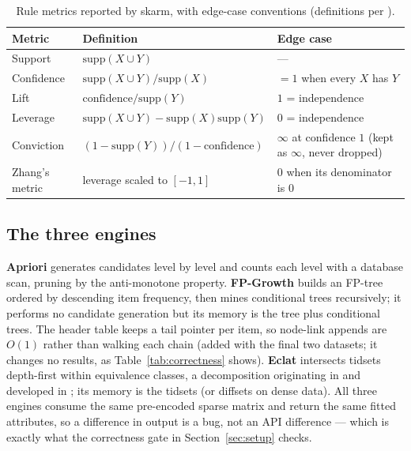 \documentclass[journal,a4paper]{IEEEtran}
\newcommand{\skarm}{skarm\xspace}
\begin{document}
\begin{table}[t]
\centering
\caption{Rule metrics reported by \skarm, with edge-case conventions
(definitions per \cite{hahsler}).}
\label{tab:metrics}
\begin{tabular}{lll}
\toprule
Metric & Definition & Edge case \\
\midrule
Support & $\mathrm{supp}(X \cup Y)$ & --- \\
Confidence & $\mathrm{supp}(X \cup Y) / \mathrm{supp}(X)$ & $=1$ when every $X$ has $Y$ \\
Lift & $\mathrm{confidence} / \mathrm{supp}(Y)$ & $1$ = independence \\
Leverage & $\mathrm{supp}(X \cup Y) - \mathrm{supp}(X)\mathrm{supp}(Y)$ & $0$ = independence \\
Conviction & $(1 - \mathrm{supp}(Y)) / (1 - \mathrm{confidence})$ & $\infty$ at confidence $1$ (kept as $\infty$, never dropped) \\
Zhang's metric & leverage scaled to $[-1, 1]$ & $0$ when its denominator is $0$ \\
\bottomrule
\end{tabular}
\end{table}

\subsection{The three engines}
\textbf{Apriori} generates candidates level by level and counts each
level with a database scan, pruning by the anti-monotone property.
\textbf{FP-Growth} builds an FP-tree ordered by descending item
frequency, then mines conditional trees recursively; it performs no
candidate generation but its memory is the tree plus conditional trees.
The header table keeps a tail pointer per item, so node-link appends
are $O(1)$ rather than walking each chain (added with the final two
datasets; it changes no results, as Table~\ref{tab:correctness}
shows).
\textbf{Eclat} intersects tidsets depth-first within equivalence
classes, a decomposition originating in \cite{zaki1997} and developed
in \cite{zaki2000}; its memory is the tidsets (or diffsets on dense data). All
three engines consume the same pre-encoded sparse matrix and return the
same fitted attributes, so a difference in output is a bug, not an API
difference --- which is exactly what the correctness gate in
Section~\ref{sec:setup} checks.
\end{document}
